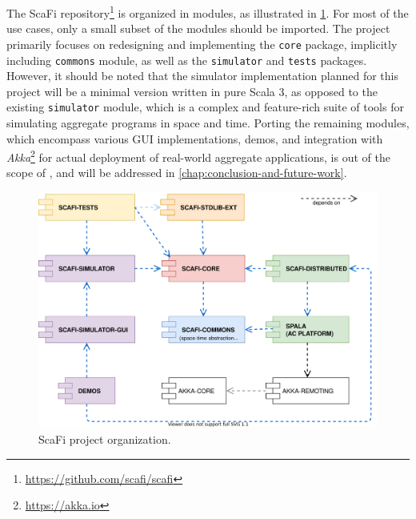 The ScaFi repository\footnote{\url{https://github.com/scafi/scafi}} is organized in modules, as illustrated in \cref{fig:scafi-project-org}.
%
For most of the use cases, only a small subset of the modules should be imported.
%
The \this project primarily focuses on redesigning and implementing the \texttt{core} package, implicitly including \texttt{commons} module, as well as the \texttt{simulator} and \texttt{tests} packages.
%
However, it should be noted that the simulator implementation planned for this project will be a minimal version written in pure Scala 3, as opposed to the existing \texttt{simulator} module, which is a complex and feature-rich suite of tools for simulating aggregate programs in space and time.
%
Porting the remaining modules, which encompass various \ac{GUI} implementations, demos, and integration with \textit{Akka}\footnote{\url{https://akka.io}} for actual deployment of real-world aggregate applications, is out of the scope of \this, and will be addressed in \cref{chap:conclusion-and-future-work}.

\begin{figure}
    \centering
    \includegraphics[width=.8\linewidth]{figures/scafi-project-org.drawio.png}
    \caption{ScaFi project organization.}
    \label{fig:scafi-project-org}
\end{figure}

